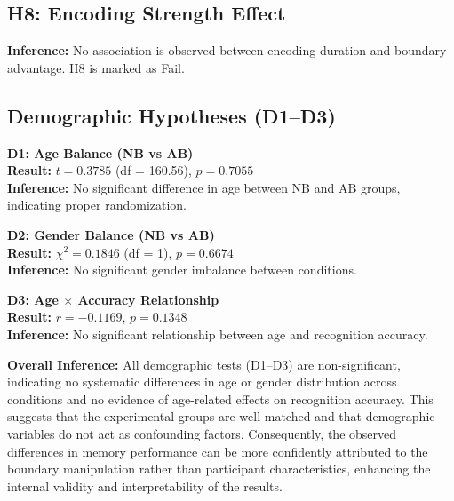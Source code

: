 \documentclass[11pt]{article}
\begin{document}
\subsection{H8: Encoding Strength Effect}
\begin{table}[htbp]
\centering
\caption{H8 tests}
\end{table}
\textbf{Inference:} No association is observed between encoding duration and boundary advantage. H8 is marked as Fail.


\subsection{Demographic Hypotheses (D1--D3)}

\textbf{D1: Age Balance (NB vs AB)} \\
\textbf{Result:} $t = 0.3785$ (df = 160.56), $p = 0.7055$ \\
\textbf{Inference:} No significant difference in age between NB and AB groups, indicating proper randomization.

\vspace{0.2cm}

\textbf{D2: Gender Balance (NB vs AB)} \\
\textbf{Result:} $\chi^2 = 0.1846$ (df = 1), $p = 0.6674$ \\
\textbf{Inference:} No significant gender imbalance between conditions.

\vspace{0.2cm}

\textbf{D3: Age $\times$ Accuracy Relationship} \\
\textbf{Result:} $r = -0.1169$, $p = 0.1348$ \\
\textbf{Inference:} No significant relationship between age and recognition accuracy.

\vspace{0.2cm}

\textbf{Overall Inference:} All demographic tests (D1--D3) are non-significant, indicating no systematic differences in age or gender distribution across conditions and no evidence of age-related effects on recognition accuracy. This suggests that the experimental groups are well-matched and that demographic variables do not act as confounding factors. Consequently, the observed differences in memory performance can be more confidently attributed to the boundary manipulation rather than participant characteristics, enhancing the internal validity and interpretability of the results.
\end{document}
